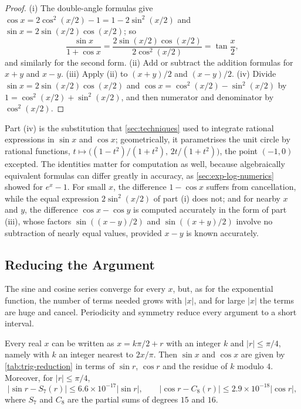 \begin{proof}
(i) The double-angle formulas give $\cos x=2\cos^2(x/2)-1=1-2\sin^2(x/2)$ and $\sin x=2\sin(x/2)\cos(x/2)$; so
\[
\frac{\sin x}{1+\cos x}=\frac{2\sin(x/2)\cos(x/2)}{2\cos^2(x/2)}=\tan\frac x2,
\]
and similarly for the second form. (ii) Add or subtract the addition formulas for $x+y$ and $x-y$. (iii) Apply (ii) to $(x+y)/2$ and $(x-y)/2$. (iv) Divide $\sin x=2\sin(x/2)\cos(x/2)$ and $\cos x=\cos^2(x/2)-\sin^2(x/2)$ by $1=\cos^2(x/2)+\sin^2(x/2)$, and then numerator and denominator by $\cos^2(x/2)$.
\end{proof}

Part (iv) is the substitution that \cref{sec:techniques} used to integrate rational expressions in $\sin x$ and $\cos x$; geometrically, it parametrises the unit circle by rational functions, $t\mapsto\bigl((1-t^2)/(1+t^2),\,2t/(1+t^2)\bigr)$, the point $(-1,0)$ excepted. The identities matter for computation as well, because algebraically equivalent formulas can differ greatly in accuracy, as \cref{sec:exp-log-numerics} showed for $e^x-1$. For small $x$, the difference $1-\cos x$ suffers from cancellation, while the equal expression $2\sin^2(x/2)$ of part (i) does not; and for nearby $x$ and $y$, the difference $\cos x-\cos y$ is computed accurately in the form of part (iii), whose factors $\sin((x-y)/2)$ and $\sin((x+y)/2)$ involve no subtraction of nearly equal values, provided $x-y$ is known accurately.

\subsection{Reducing the Argument}

The sine and cosine series converge for every $x$, but, as for the exponential function, the number of terms needed grows with $|x|$, and for large $|x|$ the terms are huge and cancel. Periodicity and symmetry reduce every argument to a short interval.

\begin{proposition}
\label{prop:trig-reduction}
Every real $x$ can be written as $x=k\pi/2+r$ with an integer $k$ and $|r|\le\pi/4$, namely with $k$ an integer nearest to $2x/\pi$. Then $\sin x$ and $\cos x$ are given by \cref{tab:trig-reduction} in terms of $\sin r$, $\cos r$ and the residue of $k$ modulo $4$. Moreover, for $|r|\le\pi/4$,
\[
|\sin r-S_7(r)|\le6.6\times10^{-17}|\sin r|,\qquad|\cos r-C_8(r)|\le2.9\times10^{-18}|\cos r| ,
\]
where $S_7$ and $C_8$ are the partial sums of degrees $15$ and $16$.
\end{proposition}

